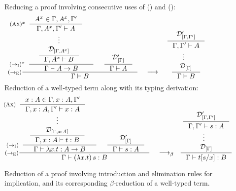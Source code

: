 \begin{figure}
Reducing a proof involving consecutive uses of
() and ():
\[
\inference[($->_\textsc{E}$)]
	{\hspace*{-3em}
	 \inference[$(->_\textsc{I})^{x}$]
		{\hspace*{-1em}
		 \inference*
			{\hspace*{-4em}
			 \inference[$(\textsc{Ax})^{x}$]
				{A^x\in\Gamma,A^x,\Gamma'}
				{\Gamma,A^x,\Gamma' |- A} \\
			 \vdots \\
			 \mathcal{D}_{[\Gamma,A^x]} }
			{\Gamma,A^x |- B} }
		{\Gamma |- A -> B}
	&\inference*{\mathcal{D}'_{[\Gamma]}}{\Gamma |- A} }
	{\Gamma |- B}
\quad
\longrightarrow
~
\inference*
	{\inference*
		{\mathcal{D}'_{[\Gamma,\Gamma']}}
		{\Gamma,\Gamma' |- A} \\
	 \vdots_{\phantom{G}} \\
	 \mathcal{D}_{[\Gamma]} }
	{\Gamma |- B}
\]
Reduction of a well-typed term along with its typing derivation:
\[
\inference[($->_\textsc{E}$)]
	{\hspace*{-3em}
	 \inference[$(->_\textsc{I})$]
		{\hspace*{-1em}
		 \inference*
			{\hspace*{-4em}
			 \inference[$(\textsc{Ax})$]
				{x:A\in\Gamma,x:A,\Gamma'}
				{\Gamma,x:A,\Gamma' |- x:A} \\
			 \vdots \\
			 \mathcal{D}_{[\Gamma,x:A]} }
			{\Gamma,x:A |- t:B} }
		{\Gamma |- \l x.t : A -> B}
	&\inference*{\mathcal{D}'_{[\Gamma]}}{\Gamma |- s:A} }
	{\Gamma |- (\l x.t)\,s:B}
\quad
\longrightarrow_\beta
~
\inference*
	{\inference*
		{\mathcal{D}'_{[\Gamma,\Gamma']}}
		{\Gamma,\Gamma' |- s:A} \\
	 \vdots_{\phantom{G}} \\
	 \mathcal{D}_{[\Gamma]} }
	{\Gamma |- t[s/x]:B}
\]
\caption{Reduction of a proof involving introduction and elimination rules
	for implication, and its corresponding $\beta$-reduction 
	of a well-typed term.}
\label{fig:proofreduce}
\end{figure}


